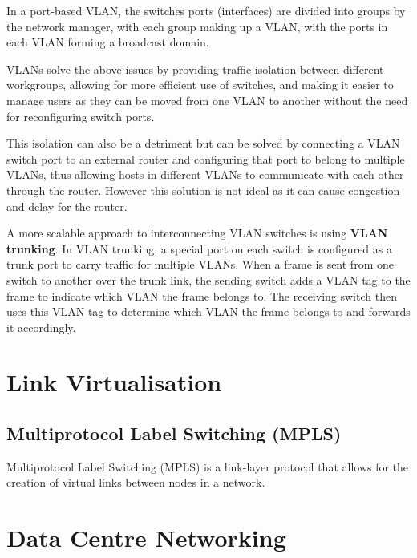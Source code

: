\documentclass[12pt letter]{report}
\begin{document}

In a port-based VLAN, the switches ports (interfaces) are divided
into groups by the network manager, with each group making up a VLAN,
with the ports in each VLAN forming a broadcast domain.

VLANs solve the above issues by providing traffic isolation between
different workgroups, allowing for more efficient use of switches,
and making it easier to manage users as they can be moved from one
VLAN to another without the need for reconfiguring switch ports.

This isolation can also be a detriment but can be solved by
connecting a VLAN switch port to an external router and configuring
that port to belong to multiple VLANs, thus allowing hosts in
different VLANs to communicate with each other through the router.
However this solution is not ideal as it can cause congestion and
delay for the router.


A more scalable approach to interconnecting VLAN switches is using
\textbf{VLAN trunking}. In VLAN trunking, a special port on each
switch is configured as a trunk port to carry traffic for multiple
VLANs. When a frame is sent from one switch to another over the trunk
link, the sending switch adds a VLAN tag to the frame to indicate
which VLAN the frame belongs to. The receiving switch then uses this
VLAN tag to determine which VLAN the frame belongs to and forwards it
accordingly.

\chapter{Link Virtualisation}

\section{Multiprotocol Label Switching (MPLS)}

Multiprotocol Label Switching (MPLS) is a link-layer protocol that
allows for the creation of virtual links between nodes in a network.

\chapter{Data Centre Networking}
\end{document}
